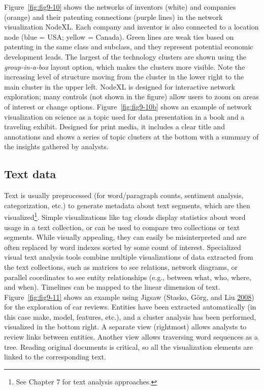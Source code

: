 \documentclass[]{krantz}
\begin{document}
Figure~\ref{fig:fig9-10} shows the networks of inventors (white) and
companies (orange) and their patenting connections (purple lines) in the
network visualization NodeXL. Each company and inventor is also
connected to a location node (blue = USA; yellow = Canada). Green lines
are weak ties based on patenting in the same class and subclass, and
they represent potential economic development leads. The largest of the
technology clusters are shown using the \emph{group-in-a-box} layout
option, which makes the clusters more visible. Note the increasing level
of structure moving from the cluster in the lower right to the main
cluster in the upper left. NodeXL is designed for interactive network
exploration; many controls (not shown in the figure) allow users to zoom
on areas of interest or change options. Figure~\ref{fig:fig9-10b} shows
an example of network visualization on science as a topic used for data
presentation in a book and a traveling exhibit. Designed for print
media, it includes a clear title and annotations and shows a series of
topic clusters at the bottom with a summary of the insights gathered by
analysts.

\vspace*{6pt}

\subsection{Text data}\label{sec:viz-2.7}

Text is usually preprocessed (for word/paragraph counts, sentiment
analysis, categorization, etc.) to generate metadata about text
segments, which are then visualized\footnote{See Chapter 7 for text
  analysis approaches.}. Simple visualizations like tag clouds display
statistics about word usage in a text collection, or can be used to
compare two collections or text segments. While visually appealing, they
can easily be misinterpreted and are often replaced by word indexes
sorted by some count of interest. Specialized visual text analysis tools
combine multiple visualizations of data extracted from the text
collections, such as matrices to see relations, network diagrams, or
parallel coordinates to see entity relationships (e.g., between what,
who, where, and when). Timelines can be mapped to the linear dimension
of text. Figure~\ref{fig:fig9-11} shows an example using Jigsaw (Stasko,
Görg, and Liu \protect\hyperlink{ref-stasko2008jigsaw}{2008}) for the
exploration of car reviews. Entities have been extracted automatically
(in this case make, model, features, etc.), and a cluster analysis has
been performed, visualized in the bottom right. A separate view
(rightmost) allows analysts to review links between entities. Another
view allows traversing word sequences as a tree. Reading original
documents is critical, so all the visualization elements are linked to
the corresponding text.
\end{document}
